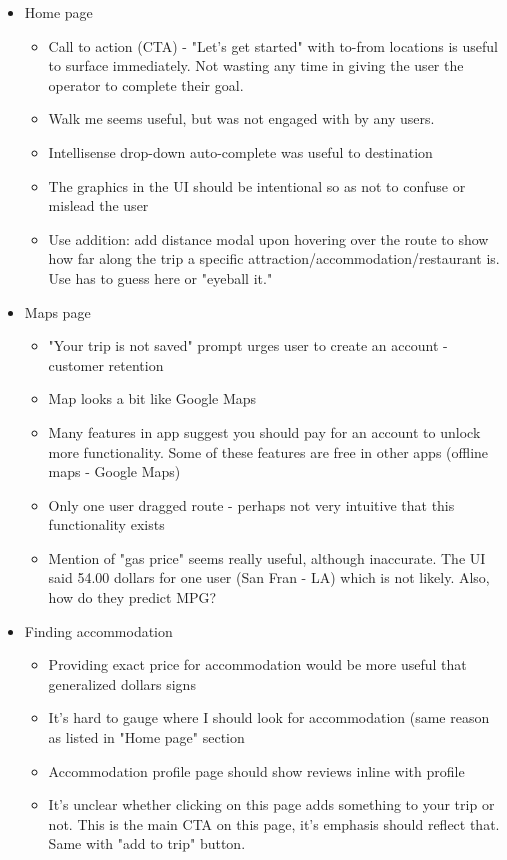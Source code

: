 \begin{itemize}
\item Home page
  \begin{itemize}
  \item Call to action (CTA) - "Let's get started" with to-from locations is useful to surface immediately. Not wasting any time in giving the user the operator to complete their goal.
  \item Walk me seems useful, but was not engaged with by any users.
  \item Intellisense drop-down auto-complete was useful to destination
  \item The graphics in the UI should be intentional so as not to confuse or mislead the user
  \item Use addition: add distance modal upon hovering over the route to show how far along the trip a specific attraction/accommodation/restaurant is. Use has to guess here or "eyeball it."
  \end{itemize}
\item Maps page
  \begin{itemize}
  \item "Your trip is not saved" prompt urges user to create an account - customer retention
  \item Map looks a bit like Google Maps
  \item Many features in app suggest you should pay for an account to unlock more functionality. Some of these features are free in other apps (offline maps - Google Maps)
  \item Only one user dragged route - perhaps not very intuitive that this functionality exists
  \item Mention of "gas price" seems really useful, although inaccurate. The UI said 54.00 dollars for one user (San Fran - LA) which is not likely. Also, how do they predict MPG?
  \end{itemize}
\item Finding accommodation
  \begin{itemize}
  \item Providing exact price for accommodation would be more useful that generalized dollars signs
  \item It's hard to gauge where I should look for accommodation (same reason as listed in "Home page" section
  \item Accommodation profile page should show reviews inline with profile
  \item It's unclear whether clicking on this page adds something to your trip or not. This is the main CTA on this page, it's emphasis should reflect that. Same with "add to trip" button.

\end{itemize}
\end{itemize}
